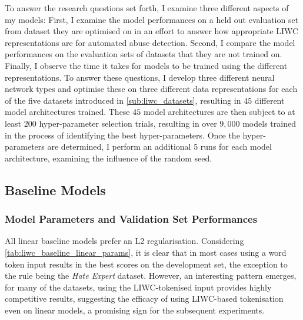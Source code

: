 To answer the research questions set forth, I examine three different aspects of my models: First, I examine the model performances on a held out evaluation set from dataset they are optimised on in an effort to answer how appropriate LIWC representations are for automated abuse detection. 
Second, I compare the model performances on the evaluation sets of datasets that they are not trained on. 
Finally, I observe the time it takes for models to be trained using the different representations.
To answer these questions, I develop three different neural network types and optimise these on three different data representations for each of the five datasets introduced in \cref{sub:liwc_datasets}, resulting in $45$ different model architectures trained. 
These $45$ model architectures are then subject to at least $200$ hyper-parameter selection trials, resulting in over $9,000$ models trained in the process of identifying the best hyper-parameters. Once the hyper-parameters are determined, I perform an additional $5$ runs for each model architecture, examining the influence of the random seed.

\subsection{Baseline Models}

\subsubsection{Model Parameters and Validation Set Performances}
All linear baseline models prefer an L2 regularisation. Considering \cref{tab:liwc_baseline_linear_params}, it is clear that in most cases using a word token input results in the best scores on the development set, the exception to the rule being the \textit{Hate Expert} dataset. However, an interesting pattern emerges, for many of the datasets, using the LIWC-tokenised input provides highly competitive results, suggesting the efficacy of using LIWC-based tokenisation even on linear models, a promising sign for the subsequent experiments.

